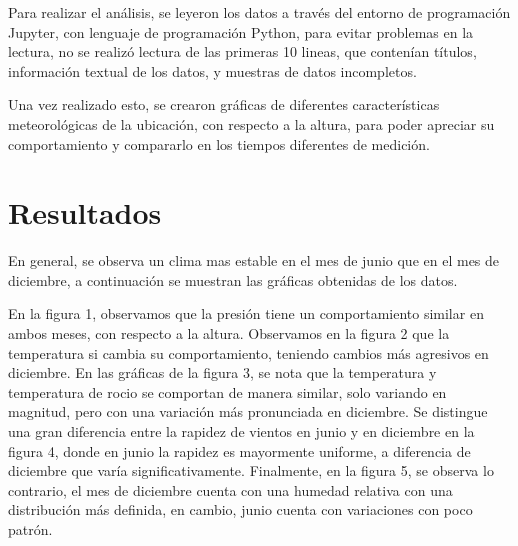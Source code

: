 \documentclass[a4paper]{article}
\begin{document}
Para realizar el análisis, se leyeron los datos a través del entorno de programación Jupyter, con lenguaje de programación Python, para evitar problemas en la lectura, no se realizó lectura de las primeras 10 lineas, que contenían títulos, información textual de los datos, y muestras de datos incompletos.

Una vez realizado esto, se crearon gráficas de diferentes características meteorológicas de la ubicación, con respecto a la altura, para poder apreciar su comportamiento y compararlo en los tiempos diferentes de medición.

\section*{Resultados}

En general, se observa un clima mas estable en el mes de junio que en el mes de diciembre, a continuación se muestran las gráficas obtenidas de los datos.

En la figura 1, observamos que la presión tiene un comportamiento similar en ambos meses, con respecto a la altura. Observamos en la figura 2 que la temperatura si cambia su comportamiento, teniendo cambios más agresivos en diciembre. En las gráficas de la figura 3, se nota que la temperatura y temperatura de rocio se comportan de manera similar, solo variando en magnitud, pero con una variación más pronunciada en diciembre. Se distingue una gran diferencia entre la rapidez de vientos en junio y en diciembre en la figura 4, donde en junio la rapidez es mayormente uniforme, a diferencia de diciembre que varía significativamente. Finalmente, en la figura 5, se observa lo contrario, el mes de diciembre cuenta con una humedad relativa con una distribución más definida, en cambio, junio cuenta con variaciones con poco patrón.
\end{document}
